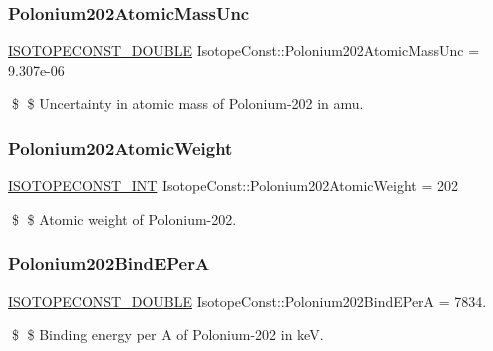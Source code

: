 \subsubsection{\texorpdfstring{Polonium202\+Atomic\+Mass\+Unc}{Polonium202AtomicMassUnc}}
{\footnotesize\ttfamily \mbox{\hyperlink{group___isotope_const-_macros_ga8f45a7272ce02c0b4c65c44636ed719a}{I\+S\+O\+T\+O\+P\+E\+C\+O\+N\+S\+T\+\_\+\+D\+O\+U\+B\+LE}} Isotope\+Const\+::\+Polonium202\+Atomic\+Mass\+Unc = 9.\+307e-\/06}

\$ \$ Uncertainty in atomic mass of Polonium-\/202 in amu. \mbox{\label{group___isotope_const-_polonium-_po202_gaf75a6c8de0769ac6010bed72f51eb6ca}} 
\subsubsection{\texorpdfstring{Polonium202\+Atomic\+Weight}{Polonium202AtomicWeight}}
{\footnotesize\ttfamily \mbox{\hyperlink{group___isotope_const-_macros_ga5f18360b3e99483a35c32d789e62621c}{I\+S\+O\+T\+O\+P\+E\+C\+O\+N\+S\+T\+\_\+\+I\+NT}} Isotope\+Const\+::\+Polonium202\+Atomic\+Weight = 202}

\$ \$ Atomic weight of Polonium-\/202. \mbox{\label{group___isotope_const-_polonium-_po202_ga5c00d10617e1c50c52d0c1ccc061504b}} 
\subsubsection{\texorpdfstring{Polonium202\+Bind\+E\+PerA}{Polonium202BindEPerA}}
{\footnotesize\ttfamily \mbox{\hyperlink{group___isotope_const-_macros_ga8f45a7272ce02c0b4c65c44636ed719a}{I\+S\+O\+T\+O\+P\+E\+C\+O\+N\+S\+T\+\_\+\+D\+O\+U\+B\+LE}} Isotope\+Const\+::\+Polonium202\+Bind\+E\+PerA = 7834.}

\$ \$ Binding energy per A of Polonium-\/202 in keV. \mbox{\label{group___isotope_const-_polonium-_po202_gaf363aa960a392291a16fc93333d99bfb}} 
